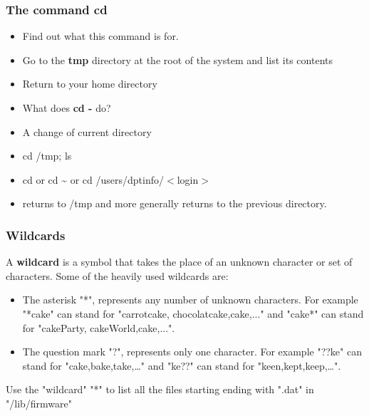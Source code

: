 \documentclass[11pt]{article}
\begin{document}
\subsubsection{The command \textbf{cd}}

\begin{itemize}
	\item Find out what this command is for.
	\item Go to the \textbf{tmp} directory at the root of the system and list its contents
	\item Return to your home directory
	\item What does \textbf{cd -} do?
\end{itemize}

\begin{solution}
	\begin{itemize}
		\item A change of current directory
		\item cd /tmp; ls
		\item cd or cd \textasciitilde{} or cd /users/dptinfo/$<$login$>$
		\item returns to /tmp and more generally returns to the previous directory.
	\end{itemize}
\end{solution}

\subsubsection{Wildcards}


A {\bf wildcard} is a symbol that takes the place of an unknown character or set of characters. Some of the heavily used wildcards are:
\begin{itemize}
	\item The asterisk "*", represents any number of unknown characters. For example "*cake" can stand for "carrotcake, chocolatcake,cake,..." and "cake*" can stand for "cakeParty, cakeWorld,cake,...".
	\item The question mark "?", represents only one character. For example "??ke" can stand for "cake,bake,take,\ldots" and "ke??" can stand for "keen,kept,keep,\ldots". 
\end{itemize}
\smallskip
Use the "wildcard" "*" to list all the files starting ending with ".dat" in "/lib/firmware"
\end{document}

